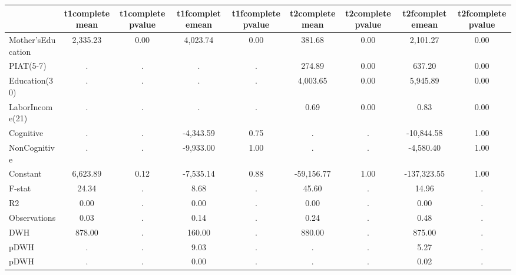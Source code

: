 \begin{table}[htbp]
\begin{tabular}{lcccccccc} \hline \hline
 & t1completemean  & t1completepvalue  & t1fcompletemean  & t1fcompletepvalue  & t2completemean  & t2completepvalue  & t2fcompletemean  & t2fcompletepvalue  \\  \hline 
Mother'sEducation &     2,335.23 &         0.00 &     4,023.74 &         0.00 &       381.68 &         0.00 &     2,101.27 &         0.00 \\  
PIAT(5-7) &            . &            . &            . &            . &       274.89 &         0.00 &       637.20 &         0.00 \\  
Education(30) &            . &            . &            . &            . &     4,003.65 &         0.00 &     5,945.89 &         0.00 \\  
LaborIncome(21) &            . &            . &            . &            . &         0.69 &         0.00 &         0.83 &         0.00 \\  
Cognitive &            . &            . &    -4,343.59 &         0.75 &            . &            . &   -10,844.58 &         1.00 \\  
NonCognitive &            . &            . &    -9,933.00 &         1.00 &            . &            . &    -4,580.40 &         1.00 \\  
Constant &     6,623.89 &         0.12 &    -7,535.14 &         0.88 &   -59,156.77 &         1.00 &  -137,323.55 &         1.00 \\  
F-stat &        24.34 &            . &         8.68 &            . &        45.60 &            . &        14.96 &            . \\  
R2 &         0.00 &            . &         0.00 &            . &         0.00 &            . &         0.00 &            . \\  
Observations &         0.03 &            . &         0.14 &            . &         0.24 &            . &         0.48 &            . \\  
DWH &       878.00 &            . &       160.00 &            . &       880.00 &            . &       875.00 &            . \\  
pDWH &            . &            . &         9.03 &            . &            . &            . &         5.27 &            . \\  
pDWH &            . &            . &         0.00 &            . &            . &            . &         0.02 &            . \\  
\hline \hline \end{tabular}
\end{table}
